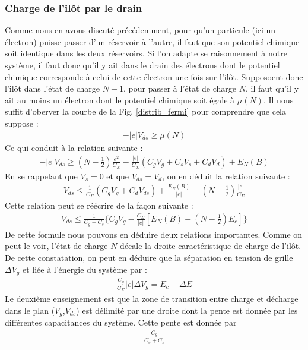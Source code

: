 \subsubsection{Charge de l'il\^ot par le drain}
Comme nous en avons discuté précédemment, pour qu'un particule (ici un électron) puisse passer d'un réservoir à l'autre, il faut que son potentiel chimique soit identique dans les deux réservoirs. Si l'on adapte se raisonnement à notre système, il faut donc qu'il y ait dans le drain des électrons dont le potentiel chimique corresponde à celui de cette électron une fois sur l'il\^ot. Supposoent donc l'il\^ot dans l'état de charge $N-1$, pour passer à l'état de charge $N$, il faut qu'il y ait au moins un électron dont le potentiel chimique soit égale à $\mu(N)$. Il nous suffit d'oberver la courbe de la Fig. \ref{distrib_fermi} pour comprendre que cela suppose :
\begin{eqnarray}
-|e|V_{ds} \geq \mu(N)
\end{eqnarray}
Ce qui conduit à la relation suivante :
\begin{eqnarray}
-|e|V_{ds} \geq (N-\frac{1}{2})\frac{e^2}{C_{\Sigma}}
-
\frac{|e|}{C_{\Sigma}}(C_gV_g + C_sV_s + C_dV_d)
+
E_N(B) \nonumber
\end{eqnarray}
En se rappelant que $V_s= 0$ et que $V_{ds} = V_d$, on en déduit la relation suivante :
\begin{eqnarray}
V_{ds} \leq \frac{1}{C_{\Sigma}}(C_gV_g + C_dV_{ds}) + \frac{E_N(B)}{|e|} - (N-\frac{1}{2})\frac{|e|}{C_{\Sigma}} \nonumber
\end{eqnarray}
Cette relation peut se réécrire de la façon suivante :
\begin{eqnarray}
V_{ds} \leq \frac{1}{C_g + C_s} \{C_gV_g - \frac{C_{\Sigma}}{|e|}[E_N(B) + (N-\frac{1}{2})E_c] \}
\end{eqnarray}
De cette formule nous pouvons en déduire deux relations importantes. Comme on peut le voir, l'état de charge $N$ décale la droite caractéristique de charge de l'il\^ot. De cette constatation, on peut en déduire que la séparation en tension de grille $\Delta V_g$ et liée à l'énergie du système par :
\begin{eqnarray}
\frac{C_g}{C_{\Sigma}} |e| \Delta V_g = E_c + \Delta E
\end{eqnarray}
Le deuxième enseignement est que la zone de transition entre charge et décharge dans le plan ($V_g$,$V_{ds}$) est délimité par une droite dont la pente est donnée par les différentes capacitances du système. Cette pente est donnée par 
\begin{eqnarray}
\frac{C_g}{C_g + C_s}
\end{eqnarray}



